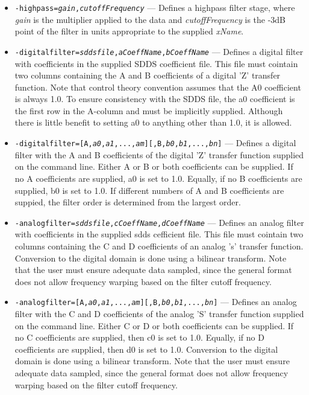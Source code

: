 \begin{itemize}
\begin{itemize}
   \item {\tt -highpass={\em gain},{\em cutoffFrequency}} --- Defines a highpass filter stage,
where {\em gain} is the multiplier applied to the data and {\em cutoffFrequency} is the -3dB point
of the filter in units appropriate to the supplied {\em xName}.

   \item {\tt -digitalfilter={\em sddsfile},{\em aCoeffName},{\em bCoeffName}} --- Defines a digital
filter with coefficients in the supplied SDDS coefficient file. This file must cointain two
columns containing the A and B coefficients of a digital 'Z' transfer function. Note that
control theory convention assumes that the A0 coefficient is always 1.0. To ensure
consistency with the SDDS file, the a0 coefficient is the first row in the A-column and
must be implicitly supplied. Although there is little benefit to setting a0
to anything other than 1.0, it is allowed.

 \item {\tt -digitalfilter=[A,{\em a0},{\em a1},...,{\em am}][,B,{\em b0},{\em b1},...,{\em bn}]} --- Defines a
digital filter with the A and B coefficients of the digital 'Z' transfer function supplied
on the command line. Either A or B or both coefficients can be supplied. If no A
coefficients are supplied, a0 is set to 1.0. Equally, if no B coefficients are supplied,
b0 is set to 1.0. If different numbers of A and B coefficients are suppied, the filter
order is determined from the largest order.

   \item {\tt -analogfilter={\em sddsfile},{\em cCoeffName},{\em dCoeffName}} --- Defines an analog
filter with coefficients in the supplied sdds cefficient file. This file must cointain two
columns containing the C and D coefficients of an analog 's' transfer function. Conversion
to the digital domain is done using a bilinear transform. Note that the user must ensure
adequate data sampled, since the general format does not allow frequency warping based on
the filter cutoff frequency.

 \item {\tt -analogfilter=[A,{\em a0},{\em a1},...,{\em am}][,B,{\em b0},{\em b1},...,{\em bn}]} --- Defines an
analog filter with the C and D coefficients of the analog 'S' transfer function supplied
on the command line. Either C or D or both coefficients can be supplied. If no C
coefficients are supplied, then c0 is set to 1.0. Equally, if no D coefficients are
supplied, then d0 is set to 1.0. Conversion to the digital domain is done using a bilinear
transform. Note that the user must ensure adequate data sampled, since the general format
does not allow frequency warping based on the filter cutoff frequency.


\end{itemize}
\end{itemize}
